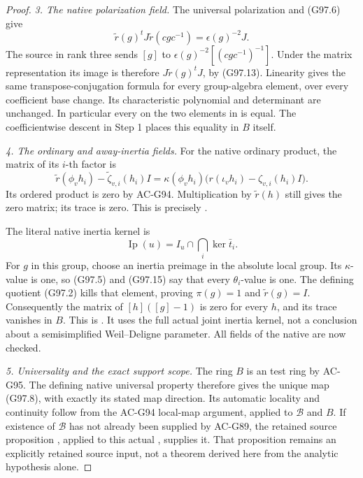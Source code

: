\begin{proof}
\emph{3. The native polarization field.}
The universal polarization and (G97.6) give
\[
 \widetilde r(g)^tJ\widetilde r(cgc^{-1})
                           =\epsilon(g)^{-2}J.
 \tag{G97.13}
\]
The source  in rank three sends
\([g]\) to \(\epsilon(g)^{-2}[(cgc^{-1})^{-1}]\).
Under the matrix representation its image is therefore
\(J\widetilde r(g)^tJ\), by (G97.13).
Linearity gives the same transpose-conjugation formula
for every group-algebra element, over every coefficient
base change.  Its characteristic polynomial and
determinant are unchanged.  In particular every
 on the two elements in 
is equal.  The coefficientwise descent in Step 1
places this equality in \(B\) itself.

\emph{4. The ordinary and away-inertia fields.}
For the native ordinary product, the matrix of its
\(i\)-th factor is
\[
 \widetilde r(\phi_v h_i)
       -\widetilde\zeta_{v,i}(h_i)I
   =\kappa(\phi_v h_i)
       \bigl(r(\iota_v h_i)-\zeta_{v,i}(h_i)I\bigr).
 \tag{G97.14}
\]
Its ordered product is zero by AC-G94.  Multiplication
by \(\widetilde r(h)\) still gives the zero matrix;
its trace is zero.  This is precisely .

The literal native inertia kernel is
\[
 \operatorname{Ip}(u)=I_u\cap\bigcap_i\ker\bar t_i.
 \tag{G97.15}
\]
For \(g\) in this group, choose an inertia preimage
in the absolute local group.  Its \(\kappa\)-value is
one, so (G97.5) and (G97.15) say that every
\(\theta_i\)-value is one.  The defining quotient
(G97.2) kills that element, proving
\(\pi(g)=1\) and \(\widetilde r(g)=I\).
Consequently the matrix of \([h]([g]-1)\) is zero
for every \(h\), and its trace vanishes in \(B\).
This is .  It uses the full actual
joint inertia kernel, not a conclusion about a
semisimplified Weil--Deligne parameter.
All fields of the native  are now checked.

\emph{5. Universality and the exact support scope.}
The ring \(B\) is an  test ring by AC-G95.
The defining native universal property therefore gives
the unique map (G97.8), with exactly its stated map
direction.  Its automatic locality and continuity
follow from the AC-G94 local-map argument, applied
to \(\mathscr B\) and \(B\).
If existence of \(\mathscr B\) has not already been
supplied by AC-G89, the retained source proposition
, applied to this actual
, supplies it.  That proposition remains
an explicitly retained source input, not a theorem
derived here from the analytic hypothesis alone.


\end{proof}
